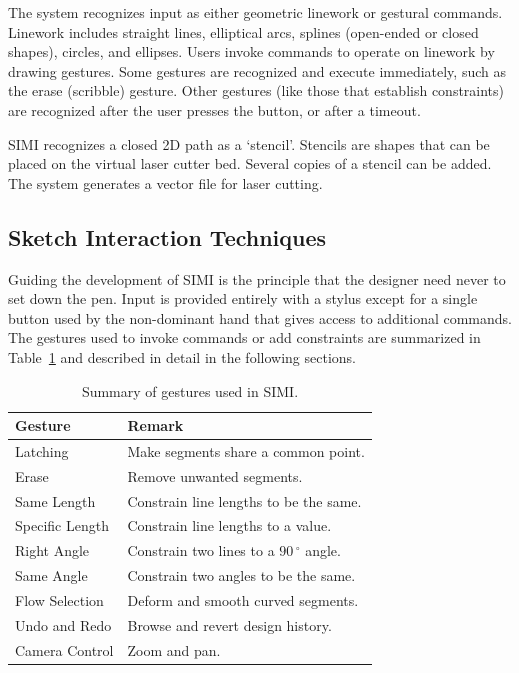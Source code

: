 \documentclass{article}
\begin{document}
The system recognizes input as either geometric linework or gestural
commands. Linework includes straight lines, elliptical arcs, splines
(open-ended or closed shapes), circles, and ellipses. Users invoke
commands to operate on linework by drawing gestures. Some gestures are
recognized and execute immediately, such as the erase (scribble)
gesture. Other gestures (like those that establish constraints) are
recognized after the user presses the button, or after a timeout.

SIMI recognizes a closed 2D path as a `stencil'. Stencils are shapes
that can be placed on the virtual laser cutter bed. Several copies of
a stencil can be added. The system generates a vector file for laser
cutting. 

\subsection{Sketch Interaction Techniques}

Guiding the development of SIMI is the principle that the designer
need never to set down the pen. Input is provided entirely with a
stylus except for a single button used by the non-dominant hand that
gives access to additional commands. The gestures used to invoke
commands or add constraints are summarized in Table~\ref{tab:gestures}
and described in detail in the following sections.

\begin{table}[h]
\centering
\begin{tabular}{ p{2.25cm} p{5.5cm} }
\textbf{Gesture} & \textbf{Remark} \\
\hline
Latching & Make segments share a common point.\\
Erase & Remove unwanted segments.\\
Same Length & Constrain line lengths to be the same.\\
Specific Length & Constrain line lengths to a value. \\
Right Angle & Constrain two lines to a $90\,^{\circ}$ angle.\\
Same Angle & Constrain two angles to be the same. \\
Flow Selection & Deform and smooth curved segments.\\
Undo and Redo & Browse and revert design history.\\
Camera Control & Zoom and pan.\\
\end{tabular}
\caption{Summary of gestures used in SIMI.}
\label{tab:gestures}
\end{table}
\end{document}
